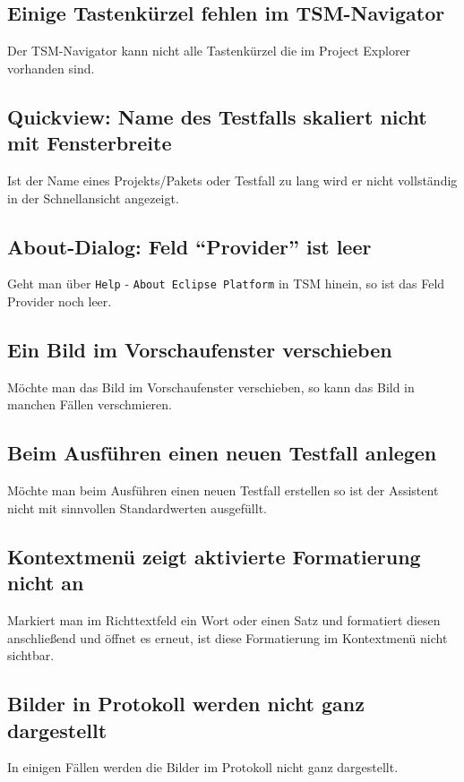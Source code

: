 \documentclass[11pt,a4paper,titlepage]{article}
\begin{document}
\subsection*{Einige Tastenkürzel fehlen im TSM-Navigator}
Der TSM-Navigator kann nicht alle Tastenkürzel die im Project Explorer vorhanden sind.

\subsection*{Quickview: Name des Testfalls skaliert nicht mit Fensterbreite}
Ist der Name eines Projekts/Pakets oder Testfall zu lang wird er nicht vollständig in der Schnellansicht angezeigt.

\subsection*{About-Dialog: Feld "`Provider"' ist leer}
Geht man über \texttt{Help} - \texttt{About Eclipse Platform} in TSM hinein, so ist das Feld Provider noch leer.

\subsection*{Ein Bild im Vorschaufenster verschieben}
Möchte man das Bild im Vorschaufenster verschieben, so kann das Bild in manchen Fällen verschmieren.

\subsection*{Beim Ausführen einen neuen Testfall anlegen}
Möchte man beim Ausführen einen neuen Testfall erstellen so ist der Assistent nicht mit sinnvollen Standardwerten ausgefüllt.

\subsection*{Kontextmenü zeigt aktivierte Formatierung nicht an}
Markiert man im Richttextfeld ein Wort oder einen Satz und formatiert diesen anschließend und öffnet es erneut, ist diese Formatierung im Kontextmenü nicht sichtbar.

\subsection*{Bilder in Protokoll werden nicht ganz dargestellt}
In einigen Fällen werden die Bilder im Protokoll nicht ganz dargestellt.
\end{document}

